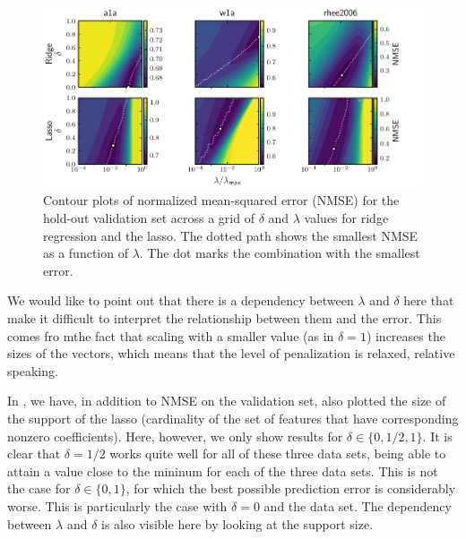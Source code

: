 \begin{figure}[htpb]
  \centering
  \includegraphics[]{plots/hyperopt_surfaces.pdf}
  \caption{%
    Contour plots of normalized mean-squared error (NMSE) for the hold-out validation set across a grid of \(\delta\) and \(\lambda\) values for ridge regression and the lasso. The dotted path shows the smallest NMSE as a function of \(\lambda\). The dot marks the combination with the smallest error.
  }
  \label{fig:hyperopt-contours}
\end{figure}

We would like to point out that there is a dependency between \(\lambda\) and \(\delta\)
here that make it difficult to interpret the relationship between them and the error. This
comes fro mthe fact that scaling with a smaller value (as in \(\delta = 1\)) increases the
sizes of the vectors, which means that the level of penalization is relaxed, relative
speaking.

In , we have, in addition to NMSE on the validation set, also
plotted the size of the support of the lasso (cardinality of the set of features that have
corresponding nonzero coefficients). Here, however, we only show results for \(\delta \in
\{0, 1/2, 1\}\). It is clear that \(\delta = 1/2\) works quite well for all of these three
data sets, being able to attain a value close to the mininum for each of the three data
sets. This is not the case for \(\delta \in \{0, 1\}\), for which the best possible
prediction error is considerably worse. This is particularly the case with \(\delta =0\)
and the  data set. The dependency between \(\lambda\) and \(\delta\) is also
visible here by looking at the support size.

